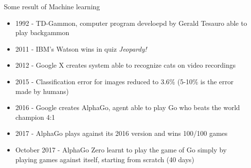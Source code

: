 \documentclass[aspectratio=169]{beamer}
\begin{document}
\begin{frame}{Some result of Machine learning}
    \begin{itemize}
        \item 1992 - TD-Gammon, computer program develoepd by Gerald Tesauro able to play backgammon
        \item 2011 - IBM's Watson wins in quiz \textit{Jeopardy!}
        \item 2012 - Google X creates system able to recognize cats on video recordings
        \item 2015 - Classification error for images reduced to 3.6\% (5-10\% is the error made by humans)
        \item 2016 - Google creates AlphaGo, agent able to play Go who beats the world champion 4:1
        \item 2017 - AlphaGo plays against its 2016 version and wins 100/100 games
        \item October 2017 - AlphaGo Zero learnt to play the game of Go simply by playing games against itself, starting from scratch (40 days)
    \end{itemize}
\end{frame}
\end{document}
